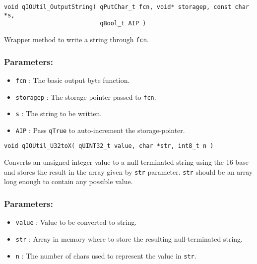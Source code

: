 \noindent\hrulefill

\begin{lstlisting}[style=CStyle]
void qIOUtil_OutputString( qPutChar_t fcn, void* storagep, const char *s, 
                           qBool_t AIP )
\end{lstlisting}

Wrapper method to write a string through \lstinline{fcn}. 

\subsubsection*{Parameters:}
\begin{itemize}
    \item \lstinline{fcn} : The basic output byte function.
    \item \lstinline{storagep} : The storage pointer passed to \lstinline{fcn}.
    \item \lstinline{s} : The string to be written.
    \item \lstinline{AIP} : Pass \lstinline{qTrue} to auto-increment the storage-pointer.
\end{itemize}

\noindent\hrulefill

\begin{lstlisting}[style=CStyle]
void qIOUtil_U32toX( qUINT32_t value, char *str, int8_t n )
\end{lstlisting}

Converts an unsigned integer value to a null-terminated string using the 16 base and stores the result in the array given by \lstinline{str} parameter. \lstinline{str} should be an array long enough to contain any possible value. 

\subsubsection*{Parameters:}
\begin{itemize}
    \item \lstinline{value} : Value to be converted to string.
    \item \lstinline{str} : Array in memory where to store the resulting null-terminated string.
    \item \lstinline{n} : The number of chars used to represent the value in \lstinline{str}. 
\end{itemize}


\noindent\hrulefill

